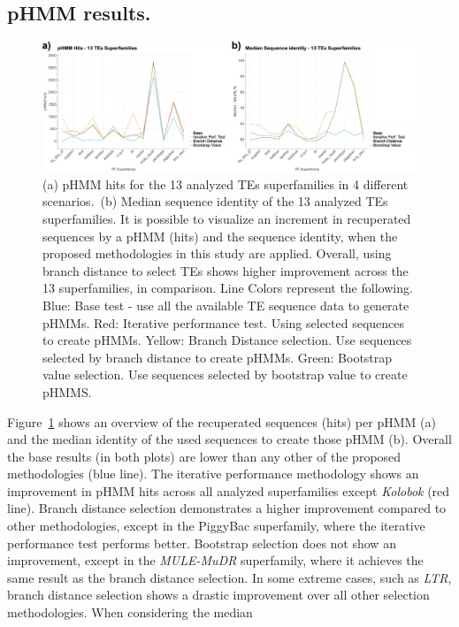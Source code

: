 \documentclass[unnumsec,webpdf,contemporary,large]{oup-authoring-template}%
\theoremstyle{thmstyleone}%
\theoremstyle{thmstyletwo}%
\theoremstyle{thmstylethree}%
\begin{document}
\subsection{pHMM results.}\label{subsec3_4}
\begin{figure}[!t]
\centering
\includegraphics[width=\textwidth]{figs/res_plots.eps}
\caption{(a) pHMM hits for the 13 analyzed TEs superfamilies in 4 different
scenarios.\ (b) Median sequence identity of the 13 analyzed TEs superfamilies. It
is possible to visualize an increment in recuperated sequences by a pHMM (hits)
and the sequence identity, when the proposed methodologies in this study are
applied. Overall, using branch distance to select TEs shows higher improvement
across the 13 superfamilies, in comparison. Line Colors represent the following.
Blue: Base test {-} use all the available TE sequence data to generate pHMMs. Red:
Iterative performance test. Using selected sequences to create pHMMs. Yellow:
Branch Distance selection. Use sequences selected by branch distance to create
pHMMs. Green: Bootstrap value selection. Use sequences selected by bootstrap
value to create pHMMS.}\label{fig:image5}
\end{figure}
\raggedbottom{}
Figure~\ref*{fig:image5} shows an overview of the recuperated sequences (hits) per pHMM (a) and the median identity of the used
sequences to create those pHMM (b). Overall the base results (in both plots) are
lower than any other of the proposed methodologies (blue line). The iterative
performance methodology shows an improvement in pHMM hits across all analyzed
superfamilies except \textit{Kolobok} (red line). Branch distance selection demonstrates
a higher improvement compared to other methodologies, except in the PiggyBac
superfamily, where the iterative performance test performs better. Bootstrap
selection does not show an improvement, except in the \textit{MULE{-}MuDR} superfamily,
where it achieves the same result as the branch distance selection. In some
extreme cases, such as \textit{LTR}, branch distance selection shows a drastic
improvement over all other selection methodologies. When considering the median
\end{document}
